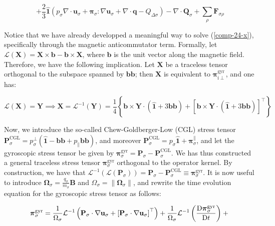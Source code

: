 \begin{equation}
    \label{comp-24-x}
    +\frac{2}{3}\mathbf{\hat{1}}\left(p_\sigma \nabla\cdot{\mathbf{u}_\sigma}+\boldsymbol{\pi}_\sigma : \nabla \mathbf{u}_\sigma+ \nabla\cdot{\mathbf{q}}-Q_{\Delta\sigma}\right)-\nabla\cdot \mathbf{Q}_{\sigma}+\sum_{\rho}\mathbf{F}_{\sigma\rho}
\end{equation}

Notice that we have already developped a meaningful way to solve (\ref{comp-24-x}), specifically through the magnetic anticommutator term. Formally, let $\mathcal{L}(\mathbf{X})=\mathbf{X}\times \mathbf{b}-\mathbf{b}\times \mathbf{X}$, where $\mathbf{b}$ is the unit vector along the magnetic field. Therefore, we have the following implication. Let $\mathbf{X}$ be a traceless tensor orthogonal to the subspace spanned by $\mathbf{b}\mathbf{b}$; then $\mathbf{X}$ is equivalent to $\boldsymbol{\pi}_{\mathrm{i}\perp}^{\mathrm{gyr}}$, and one has:

\begin{equation}
    \mathcal{L}(\mathbf{X})=\mathbf{Y}\implies \mathbf{X}=\mathcal{L}^{-1}(\mathbf{Y})=\frac{1}{4}\left\{\mathbf{b}\times \mathbf{Y}\cdot \left(\mathbf{\hat{1}}+3 \mathbf{b}\mathbf{b}\right)+\left[\mathbf{b}\times \mathbf{Y}\cdot \left(\mathbf{\hat{1}}+3 \mathbf{b}\mathbf{b}\right)\right]^\top\right\}
\end{equation}

Now, we introduce the so-called Chew-Goldberger-Low (CGL) stress tensor $\mathbf{P}_\sigma^{\mathrm{CGL}}=p_\sigma^{\perp}\left(\mathbf{\hat{1}}-\mathbf{b}\mathbf{b}+p_\parallel \mathbf{b}\mathbf{b}\right)$, and moreover $\mathbf{P}_\sigma^{\mathrm{CGL}}=p_\sigma \mathbf{\hat{1}}+\boldsymbol{\pi}_{\sigma}^{\parallel}$, and let the gyroscopic stress tensor be given by $\boldsymbol{\pi}_{\sigma}^{\mathrm{gyr}}=\mathbf{P}_\sigma-\mathbf{P}_\sigma^{\mathrm{CGL}}$. We has thus constructed a general traceless stress tensor $\boldsymbol{\pi}_\sigma^{\mathrm{gyr}}$ orthogonal to the operator kernel. By construction, we have that $\mathcal{L}^{-1}\left(\mathcal{L}\left(\mathbf{P}_\sigma\right)\right)=\mathbf{P}_\sigma - \mathbf{P}_\sigma^{\mathrm{CGL}}\equiv\boldsymbol{\pi}_\sigma^{\mathrm{gyr}}$. It is now useful to introduce $\boldsymbol{\Omega}_\sigma=\frac{q_\sigma}{m_\sigma}\mathbf{B}$ and $\Omega_\sigma=\|\boldsymbol{\Omega}_\sigma\|$, and rewrite the time evolution equation for the gyroscopic stress tensor as follows:

\begin{equation*}
    \boldsymbol{\pi}_\sigma^{\mathrm{gyr}}=\frac{1}{\Omega_\sigma}\mathcal{L}^{-1}\left(\mathbf{P}_\sigma\cdot\nabla \mathbf{u}_\sigma + \left[\mathbf{P}_\sigma\cdot\nabla \mathbf{u}_\sigma\right]^\top\right)+\frac{1}{\Omega_\sigma}\mathcal{L}^{-1}\left(\frac{\mathrm{D}\boldsymbol{\pi}_\sigma^{\mathrm{gyr}}}{\mathrm{D}t}\right)+\\
\end{equation*}

